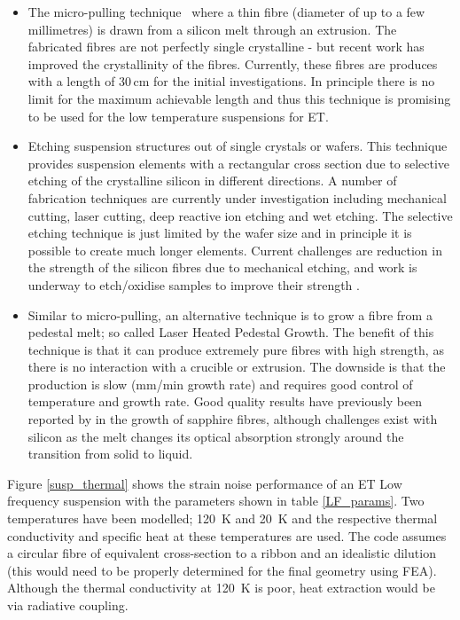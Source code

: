\begin{itemize}
\item The micro-pulling technique~\cite{articolofibresil} where a thin fibre (diameter of up to a few millimetres) is drawn from a silicon melt through an extrusion. The fabricated fibres are not perfectly single crystalline - but recent work has improved the crystallinity of the fibres. Currently, these fibres are produces with a length of 30\,cm for the initial investigations. In principle there is no limit for the maximum achievable length and thus this technique is promising to be used for the low temperature suspensions for ET.

\item Etching suspension structures out of single crystals or wafers. This technique provides suspension elements with a rectangular cross section due to selective etching of the crystalline silicon in different directions. A number of fabrication techniques are currently under investigation including mechanical cutting, laser cutting, deep reactive ion etching and wet etching. The selective etching technique is just limited by the wafer size and in principle it is possible to create much longer elements. Current challenges are reduction in the strength of the silicon fibres due to mechanical etching, and work is underway to etch/oxidise samples to improve their strength \cite{Cumming:2014}.

\item Similar to micro-pulling, an alternative technique is to grow a fibre from a pedestal melt; so called Laser Heated Pedestal Growth. The benefit of this technique is that it can produce extremely pure fibres with high strength, as there is no interaction with a crucible or extrusion. The downside is that the production is slow (mm/min growth rate) and requires good control of temperature and growth rate. Good quality results have previously been reported by \cite{Fejer:1984} in the growth of sapphire fibres, although challenges exist with silicon as the melt changes its optical absorption strongly around the transition from solid to liquid.
\end{itemize}

Figure \ref{susp_thermal} shows the strain noise performance of an ET Low frequency suspension with the parameters shown in table \ref{LF_params}. Two temperatures have been modelled; 120~K and 20~K and the respective thermal conductivity and specific heat at these temperatures are used. The code assumes a circular fibre of equivalent cross-section to a ribbon and an idealistic dilution (this would need to be properly determined for the final geometry using FEA). Although the thermal conductivity at 120~K is poor, heat extraction would be via radiative coupling.

